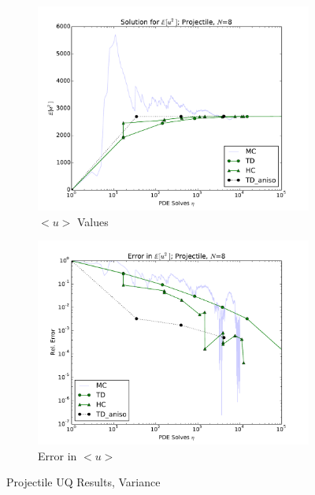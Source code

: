 \documentclass[11pt]{article}
\begin{document}
\begin{figure}[H]
    \centering
    \begin{subfigure}[b]{0.49 \textwidth}
      \includegraphics[width=\textwidth]{../graphics/projectile_solns_aniso_variance}
      \caption{$<u>$ Values}
      \label{atn vals hdmr}
  \end{subfigure}
\begin{subfigure}[b]{0.49 \textwidth}
\centering
      \includegraphics[width=\textwidth]{../graphics/projectile_errs_aniso_variance}
      \caption{Error in $<u>$}
      \label{atn errs hdmr}
    \end{subfigure}
  \caption{Projectile UQ Results, Variance}
  \label{atn results}
  \end{figure}
\end{document}
